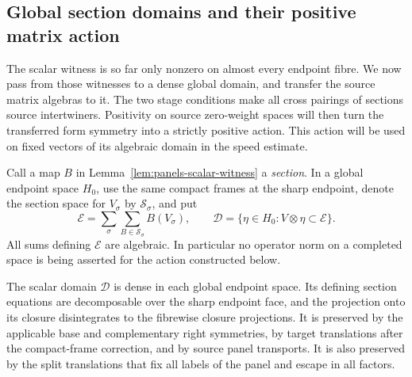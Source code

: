 \subsection{Global section domains and their positive matrix action}

The scalar witness is so far only nonzero on almost every endpoint fibre.  We now
pass from those witnesses to a dense global domain, and transfer the source
matrix algebras to it.  The two stage conditions make all cross pairings of
sections source intertwiners.  Positivity on source zero-weight spaces will
then turn the transferred form symmetry into a strictly positive action.
This action will be used on fixed vectors of its algebraic domain in the
speed estimate.

Call a map $B$ in Lemma~\ref{lem:panels-scalar-witness} a \emph{section}.
In a global endpoint space $H_0$, use the same compact frames at the
sharp endpoint, denote the section space for $V_\sigma$ by
$\mathscr S_\sigma$, and put
\[
 \mathcal E=\sum_\sigma\sum_{B\in\mathscr S_\sigma}B(V_\sigma),
 \qquad
 \mathscr D=\{\eta\in H_0:V\otimes\eta\subset\mathcal E\}.
\]
All sums defining $\mathcal E$ are algebraic.  In particular no operator
norm on a completed space is being asserted for the action constructed
below.

\begin{lemma}\label{lem:panels-global-domain}
The scalar domain $\mathscr D$ is dense in each global endpoint space.
Its defining section equations are decomposable over the sharp endpoint
face, and the projection onto its closure disintegrates to the fibrewise
closure projections.
It is preserved by the applicable base and complementary right
symmetries, by target translations after the compact-frame correction,
and by source panel transports.  It is also preserved by the split
translations that fix all labels of the panel and escape in all factors.
\end{lemma}

